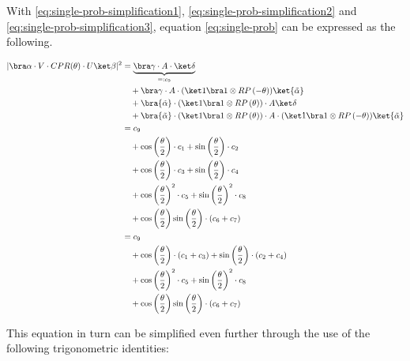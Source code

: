 With \ref{eq:single-prob-simplification1},
\ref{eq:single-prob-simplification2} and \ref{eq:single-prob-simplification3},
equation \ref{eq:single-prob} can be expressed as the following.

\begin{equation}
    \label{eq:single-prob-simplified}
    \begin{split}
        \lvert \bra\alpha \cdot V \cdot CPR(\theta) \cdot U \ket\beta \rvert^2
            &= \underbrace{\bra\gamma \cdot A \cdot \ket\delta}_{=: c_9} \\
                &\quad + \bra\gamma \cdot A \cdot (\ket 1 \bra 1 \otimes RP\left(-\theta\right)) \ket{\tilde\alpha} \\
                &\quad + \bra{\tilde\alpha} \cdot (\ket 1 \bra 1 \otimes RP\left(\theta\right)) \cdot A \ket\delta \\
                &\quad + \bra{\tilde\alpha} \cdot (\ket 1 \bra 1 \otimes RP\left(\theta\right)) \cdot A \cdot (\ket 1 \bra 1 \otimes RP\left(-\theta\right)) \ket{\tilde\alpha} \\
            &= c_9 \\
                &\quad + \cos\left(\frac\theta2\right) \cdot c_1 + \sin\left(\frac\theta2\right) \cdot c_2 \\
                &\quad + \cos\left(\frac\theta2\right) \cdot c_3 + \sin\left(\frac\theta2\right) \cdot c_4 \\
                &\quad + \cos\left(\frac\theta2\right)^2 \cdot c_5 + \sin\left(\frac\theta2\right)^2 \cdot c_8 \\
                &\quad + \cos\left(\frac\theta2\right)\sin\left(\frac\theta2\right) \cdot \left(c_6 + c_7\right) \\
            &= c_9 \\
                &\quad + \cos\left(\frac\theta2\right) \cdot \left(c_1 + c_3\right) + \sin\left(\frac\theta2\right) \cdot \left(c_2 + c_4\right) \\
                &\quad + \cos\left(\frac\theta2\right)^2 \cdot c_5 + \sin\left(\frac\theta2\right)^2 \cdot c_8 \\
                &\quad + \cos\left(\frac\theta2\right)\sin\left(\frac\theta2\right) \cdot \left(c_6 + c_7\right) \\
    \end{split}
\end{equation}

This equation in turn can be simplified even further through the use of the
following trigonometric identities:

